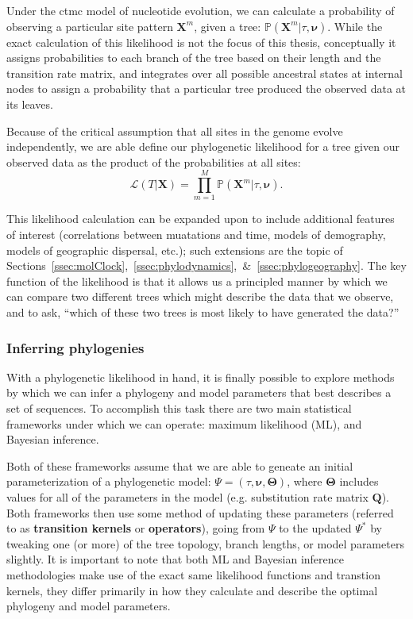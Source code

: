 Under the \gls{ctmc} model of nucleotide evolution, we can calculate a probability of observing a particular site pattern $\mathbf{X}^m$, given a tree: $\mathbb{P}(\mathbf{X}^m | \tau, \mathbf{\nu})$.
While the exact calculation of this likelihood is not the focus of this thesis, conceptually it assigns probabilities to each branch of the tree based on their length and the transition rate matrix, and integrates over all possible ancestral states at internal nodes to assign a probability that a particular tree produced the observed data at its leaves.

Because of the critical assumption that all sites in the genome evolve independently, we are able define our phylogenetic likelihood for a tree given our observed data as the product of the probabilities at all sites:
\begin{equation}\label{eq:likelihood}
  \mathcal{L}(T | \mathbf{X}) = \prod_{m=1}^M \mathbb{P}(\mathbf{X}^m | \tau, \mathbf{\nu}). 
\end{equation}

This likelihood calculation can be expanded upon to include additional features of interest (correlations between muatations and time, models of demography, models of geographic dispersal, etc.); such extensions are the topic of Sections~\ref{ssec:molClock},~\ref{ssec:phylodynamics},~\&~\ref{ssec:phylogeography}.
The key function of the likelihood is that it allows us a principled manner by which we can compare two different trees which might describe the data that we observe, and to ask, ``which of these two trees is most likely to have generated the data?''

\subsubsection{Inferring phylogenies}
With a phylogenetic likelihood in hand, it is finally possible to explore methods by which we can infer a phylogeny and model parameters that best describes a set of sequences.
To accomplish this task there are two main statistical frameworks under which we can operate: maximum likelihood (ML), and Bayesian inference.

Both of these frameworks assume that we are able to geneate an initial parameterization of a phylogenetic model: $\Psi = (\tau, \mathbf{\nu}, \mathbf{\Theta})$, where $\mathbf{\Theta}$ includes values for all of the parameters in the model (e.g. substitution rate matrix $\mathbf{Q}$).
Both frameworks then use some method of updating these parameters (referred to as \textbf{transition kernels} or \textbf{operators}), going from $\Psi$ to the updated $\Psi^*$ by tweaking one (or more) of the tree topology, branch lengths, or model parameters slightly.
It is important to note that both ML and Bayesian inference methodologies make use of the exact same likelihood functions and transtion kernels, they differ primarily in how they calculate and describe the optimal phylogeny and model parameters.

